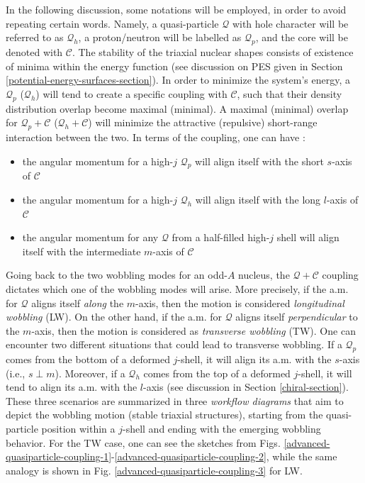 In the following discussion, some notations will be employed, in order to avoid repeating certain words. Namely, a quasi-particle $\mathcal{Q}$ with hole character will be referred to as $\mathcal{Q}_h$, a proton/neutron will be labelled as $\mathcal{Q}_p$, and the core will be denoted with $\mathscr{C}$. The stability of the triaxial nuclear shapes consists of existence of minima within the energy function (see discussion on PES given in Section \ref{potential-energy-surfaces-section}). In order to minimize the system's energy, a $\mathcal{Q}_p$ ($\mathcal{Q}_h$) will tend to create a specific coupling with $\mathscr{C}$, such that their density distribution overlap become maximal (minimal). A maximal (minimal) overlap for $\mathcal{Q}_p+\mathscr{C}$ ($\mathcal{Q}_h+\mathscr{C}$) will minimize the attractive (repulsive) short-range interaction between the two. In terms of the coupling, one can have \cite{frauendorf2014transverse}:
\begin{itemize}
    \item the angular momentum for a high-$j$ $\mathcal{Q}_p$ will align itself with the short $s$-axis of $\mathscr{C}$ 
    \item the angular momentum for a high-$j$ $\mathcal{Q}_h$ will align itself with the long $l$-axis of $\mathscr{C}$
    \item the angular momentum for any $\mathcal{Q}$ from a half-filled high-$j$ shell will align itself with the intermediate $m$-axis of $\mathscr{C}$
\end{itemize}
Going back to the two wobbling modes for an odd-$A$ nucleus, the $\mathcal{Q}+\mathscr{C}$ coupling dictates which one of the wobbling modes will arise. More precisely, if the a.m. for $\mathcal{Q}$ aligns itself \emph{along} the $m$-axis, then the motion is considered \emph{longitudinal wobbling} (LW). On the other hand, if the a.m. for $\mathcal{Q}$ aligns itself \emph{perpendicular} to the $m$-axis, then the motion is considered as \emph{transverse wobbling} (TW). One can encounter two different situations that could lead to transverse wobbling. If a $\mathcal{Q}_p$ comes from the bottom of a deformed $j$-shell, it will align its a.m. with the $s$-axis (i.e., $s\perp m$). Moreover, if a $\mathcal{Q}_h$ comes from the top of a deformed $j$-shell, it will tend to align its a.m. with the $l$-axis (see discussion in Section \ref{chiral-section}). These three scenarios are summarized in three \emph{workflow diagrams} that aim to depict the wobbling motion (stable triaxial structures), starting from the quasi-particle position within a $j$-shell and ending with the emerging wobbling behavior. For the TW case, one can see the sketches from Figs. \ref{advanced-quasiparticle-coupling-1}-\ref{advanced-quasiparticle-coupling-2}, while the same analogy is shown in Fig. \ref{advanced-quasiparticle-coupling-3} for LW.
